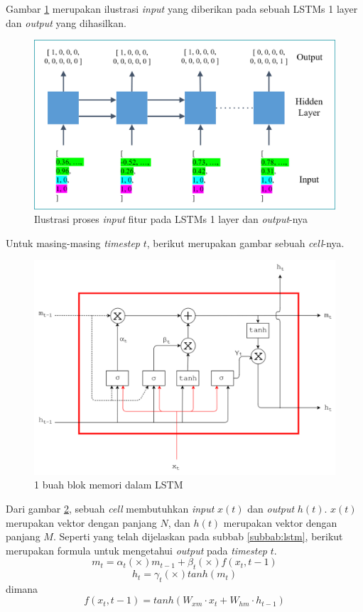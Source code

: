 \begin{enumerate}
	Gambar \ref{fig:iolstm1} merupakan ilustrasi \textit{input} yang diberikan pada sebuah LSTMs 1 layer dan \textit{output} yang dihasilkan.
	
	\begin{figure}
		\centering
		\includegraphics[width=0.85\linewidth]{images/iolstm1}
		\caption{Ilustrasi proses \textit{input} fitur pada LSTMs 1 layer dan \textit{output}-nya}
		\label{fig:iolstm1}
	\end{figure}
	
	Untuk masing-masing \textit{timestep} $ t $, berikut merupakan gambar sebuah \textit{cell}-nya.
	\begin{figure}
		\centering
		\includegraphics[width=0.85\linewidth]{images/lstm}
		\caption{1 buah blok memori dalam LSTM}
		\label{fig:lstm1cell}
	\end{figure}
	
	Dari gambar \ref{fig:lstm1cell}, sebuah \textit{cell} membutuhkan \textit{input} $ x(t) $ dan \textit{output} $ h(t) $. $ x(t) $ merupakan vektor dengan panjang $ N $, dan $ h(t) $ merupakan vektor dengan panjang $ M $. Seperti yang telah dijelaskan pada subbab \ref{subbab:lstm}, berikut merupakan formula untuk mengetahui \textit{output} pada \textit{timestep} $ t $.
	\begin{equation}\label{eq:lstmm}
	m_{t}=\alpha_{t} (\times) m_{t-1} + \beta_{t} (\times) f(x_{t},{t-1})
	\end{equation}
	\begin{equation}\label{eq:lstmh}
	h_{t}=\gamma_{t} (\times) tanh(m_{t})
	\end{equation}
	dimana
	\begin{equation}\label{eq:lstmx}
	f(x_{t},{t-1})=tanh(W_{xm} \cdot x_{t} + W_{hm} \cdot h_{t-1})
	\end{equation}
	

\end{enumerate}
